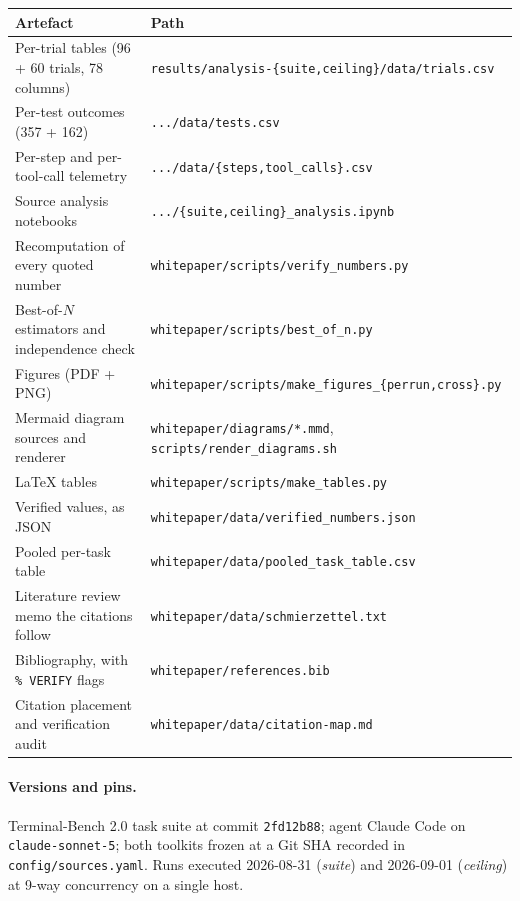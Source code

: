 \documentclass[11pt,a4paper]{article}
\newcommand{\code}[1]{\texttt{\small #1}}
\begin{document}
\begin{center}\small
\begin{tabular}{@{}ll@{}}
\toprule
Artefact & Path \\
\midrule
Per-trial tables (96 + 60 trials, 78 columns) & \code{results/analysis-\{suite,ceiling\}/data/trials.csv} \\
Per-test outcomes (357 + 162) & \code{.../data/tests.csv} \\
Per-step and per-tool-call telemetry & \code{.../data/\{steps,tool\_calls\}.csv} \\
Source analysis notebooks & \code{.../\{suite,ceiling\}\_analysis.ipynb} \\
Recomputation of every quoted number & \code{whitepaper/scripts/verify\_numbers.py} \\
Best-of-$N$ estimators and independence check & \code{whitepaper/scripts/best\_of\_n.py} \\
Figures (PDF + PNG) & \code{whitepaper/scripts/make\_figures\_\{perrun,cross\}.py} \\
Mermaid diagram sources and renderer & \code{whitepaper/diagrams/*.mmd}, \code{scripts/render\_diagrams.sh} \\
LaTeX tables & \code{whitepaper/scripts/make\_tables.py} \\
Verified values, as JSON & \code{whitepaper/data/verified\_numbers.json} \\
Pooled per-task table & \code{whitepaper/data/pooled\_task\_table.csv} \\
Literature review memo the citations follow & \code{whitepaper/data/schmierzettel.txt} \\
Bibliography, with \code{\% VERIFY} flags & \code{whitepaper/references.bib} \\
Citation placement and verification audit & \code{whitepaper/data/citation-map.md} \\
\bottomrule
\end{tabular}
\end{center}

\paragraph{Versions and pins.} Terminal-Bench 2.0 task suite at commit \code{2fd12b88};
agent Claude Code on \code{claude-sonnet-5}; both toolkits frozen at a Git SHA recorded in
\code{config/sources.yaml}. Runs executed 2026-08-31 (\emph{suite}) and 2026-09-01
(\emph{ceiling}) at 9-way concurrency on a single host.
\end{document}
